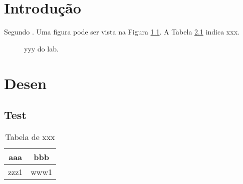 \documentclass{automatextcc}
\begin{document}
\chapter{Introdução}
Segundo \cite{Bazanella:GomesdaSilva:2006}. Uma figura pode ser vista na Figura \ref{tanque}. A Tabela \ref{tabela_nota} indica xxx.
\begin{figure}[htb]%
\centering
\caption{yyy do lab.}%
\label{tanque}%
\end{figure}

\chapter{Desen}
\section{Test}
\begin{table}[htb]%
\centering
\begin{tabular}{|c|c|}
\hline
aaa & bbb\\
\hline
zzz1 & www1\\
\hline
\end{tabular}
\caption{Tabela de xxx}
\label{tabela_nota}
\end{table}


\end{document}
